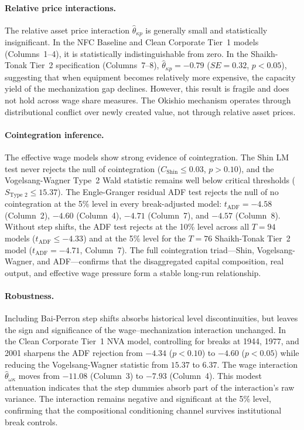 \paragraph{Relative price interactions.}
The relative asset price interaction $\hat{\theta}_{\kappa p}$ is generally small and statistically insignificant. In the NFC Baseline and Clean Corporate Tier~1 models (Columns~1--4), it is statistically indistinguishable from zero. In the Shaikh-Tonak Tier~2 specification (Columns~7--8), $\hat{\theta}_{\kappa p} = -0.79$ ($SE = 0.32$, $p < 0.05$), suggesting that when equipment becomes relatively more expensive, the capacity yield of the mechanization gap declines. However, this result is fragile and does not hold across wage share measures. The Okishio mechanism operates through distributional conflict over newly created value, not through relative asset prices.

\paragraph{Cointegration inference.}
The effective wage models show strong evidence of cointegration. The Shin LM test never rejects the null of cointegration ($C_{\text{Shin}} \le 0.03$, $p > 0.10$), and the Vogelsang-Wagner Type~2 Wald statistic remains well below critical thresholds ($S_{\text{Type~2}} \le 15.37$). The Engle-Granger residual ADF test rejects the null of no cointegration at the 5\% level in every break-adjusted model: $t_{\text{ADF}} = -4.58$ (Column~2), $-4.60$ (Column~4), $-4.71$ (Column~7), and $-4.57$ (Column~8). Without step shifts, the ADF test rejects at the 10\% level across all $T = 94$ models ($t_{\text{ADF}} \le -4.33$) and at the 5\% level for the $T = 76$ Shaikh-Tonak Tier~2 model ($t_{\text{ADF}} = -4.71$, Column~7). The full cointegration triad---Shin, Vogelsang-Wagner, and ADF---confirms that the disaggregated capital composition, real output, and effective wage pressure form a stable long-run relationship.

\paragraph{Robustness.}
Including Bai-Perron step shifts absorbs historical level discontinuities, but leaves the sign and significance of the wage--mechanization interaction unchanged. In the Clean Corporate Tier~1 NVA model, controlling for breaks at 1944, 1977, and 2001 sharpens the ADF rejection from $-4.34$ ($p < 0.10$) to $-4.60$ ($p < 0.05$) while reducing the Vogelsang-Wagner statistic from $15.37$ to $6.37$. The wage interaction $\hat{\theta}_{\omega\kappa}$ moves from $-11.08$ (Column~3) to $-7.93$ (Column~4). This modest attenuation indicates that the step dummies absorb part of the interaction's raw variance. The interaction remains negative and significant at the 5\% level, confirming that the compositional conditioning channel survives institutional break controls.

